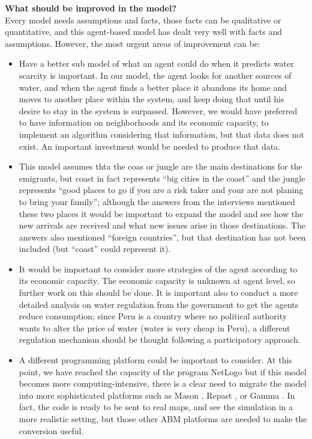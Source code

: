 \documentclass[doc,12pt,floatsintext]{apa7}
\begin{document}
{\bf What should be improved in the model?} \\
Every model needs assumptions and facts, those facts can be qualitative or quantitative, and this agent-based model has dealt very well with facts and assumptions. However, the most urgent areas of improvement can be:
\begin{itemize}
\item Have a better sub model of what an agent could do when it predicts water scarcity is important. In our model, the agent looks for another sources of water, and when the agent finds a better place it abandons its home and moves to another place within the system, and keep doing that until his desire to stay in the system is surpassed. However, we would have preferred to have information on neighborhoods and its economic capacity, to implement an algorithm considering that information, but that data does not exist. An important investment would be needed to produce that data.
\item This model assumes thta the coas or jungle are the main destinations for the emigrants, but coast in fact represents ``big cities in the coast'' and the jungle represents ``good places to go if you are a risk taker and your are not planing to bring your family''; although the answers from the interviews mentioned these two places it would be important to expand the model and see how the new arrivals are received and what new issues arise in those destinations. The answers also mentioned ``foreign countries'', but that destination has not been included (but ``coast'' could represent it).
\item It would be important to consider more strategies of the agent according to its economic capacity. The economic capacity is unknown at agent level, so further work on this should be done. It is important also to conduct a more detailed analysis on water regulation from the government to get the agents reduce consumption; since Peru is a country where no political authority wants to alter the price of water (water is very cheap in Peru), a different regulation mechanism should be thought following a participatory approach.

\item A different programming platform could be important to consider. At this point, we have reached the capacity of the program NetLogo\parencite{wilensky_introduction_2015} but if this model becomes more computing-intensive, there is a clear need to migrate the model into more sophisticated platforms such as Mason \parencite{luke_mason_2015}, Repast \parencite{north_complex_2013}, or Gamma \parencite{taillandier_building_2019}. In fact, the code is ready to be sent to real maps, and see the simulation in a more realistic setting, but those other ABM platforms are needed to make the conversion useful.
\end{itemize}
\end{document}
